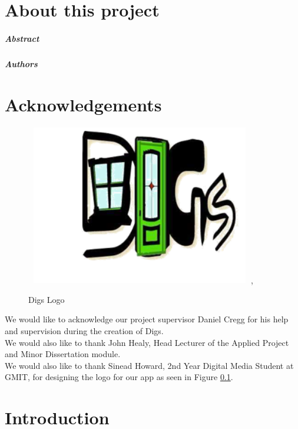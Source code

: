 
\chapter*{About this project}

\paragraph{Abstract}


\paragraph{Authors}


\chapter*{\centering Acknowledgements}

\begin{figure}[h]
\centering
\includegraphics[width=10cm, height=7cm]{img/digs.png},
\caption{Digs Logo}
\label{digs_logo}
\end{figure}


\noindent We would like to acknowledge our project supervisor Daniel Cregg for his help and supervision during the creation of Digs.\\

\noindent We would also like to thank John Healy, Head Lecturer of the Applied Project and Minor Dissertation module. \\

\noindent We would also like to thank Sinead Howard, 2nd Year Digital Media Student at GMIT, for designing the logo for our app as seen in Figure \ref{digs_logo}.


\chapter{Introduction}

